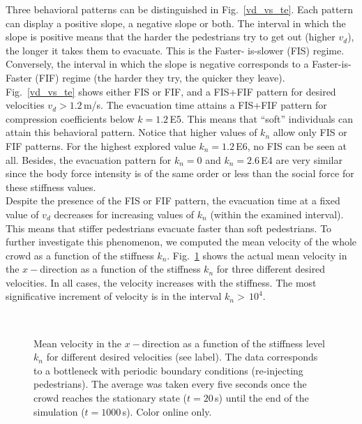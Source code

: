\documentclass[preprint,12pt]{elsarticle}
\begin{document}
Three behavioral patterns can be distinguished in Fig.~\ref{vd_vs_te}.  Each
pattern can display a positive slope, a negative slope or both. The interval in
which the slope is positive means that the  harder the pedestrians try to get
out (higher $v_d$), the  longer it takes them to evacuate. This is the Faster-
is-slower  (FIS) regime. Conversely, the interval in which the slope is
negative  corresponds to a Faster-is-Faster (FIF) regime (the  harder they try,
the quicker they leave).\\

Fig.~\ref{vd_vs_te}  shows either FIS or FIF, and a FIS+FIF pattern for desired
velocities $v_d>1.2\,$m/s. The  evacuation time attains a FIS+FIF pattern for
compression coefficients below  $k=1.2\,$E5. This means that ``soft''
individuals can attain this  behavioral pattern.  Notice that higher values of
$k_n$ allow  only FIS or FIF patterns. For the highest explored value
$k_n=1.2\,$E6, no  FIS can be seen at all. Besides, the evacuation pattern for
$k_n = 0$ and $k_n  = 2.6\,$E4 are very similar since the body force intensity
is of the same order or less than the social  force for these stiffness values.
\\

Despite the presence of the FIS or FIF pattern, the evacuation time at a  fixed
value of $v_d$ decreases for increasing values of $k_n$ (within the examined
interval).  This means that stiffer pedestrians evacuate faster than soft
pedestrians.  To further investigate this  phenomenon, we computed the mean
velocity of the whole crowd as a function of the  stiffness $k_n$.
Fig.~\ref{kn_vs_vx_bottleneck} shows the actual mean velocity in the
$x-$direction as a function of the stiffness $k_n$ for three different desired
velocities. In all cases, the velocity increases with the stiffness. The most
significative  increment of velocity is in the interval $k_n>\,10^{4}$. \\


\begin{figure}[!htbp]
\centering
{}\\
\caption[width=0.47\columnwidth]{Mean velocity in the $x-$direction as a
function  of the stiffness level $k_n$ for different desired velocities (see
label). The  data corresponds to a bottleneck with periodic boundary conditions
(re-injecting  pedestrians). The average was taken every five seconds once the
crowd reaches the  stationary state ($t=20\,$s) until the end of the simulation
($t=1000\,$s).  Color online only. }
\label{kn_vs_vx_bottleneck}
\end{figure}
\end{document}
